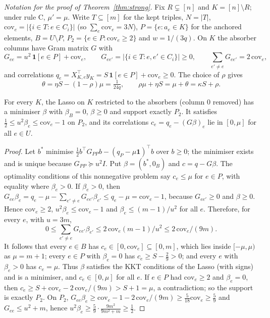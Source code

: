 \noindent\emph{Notation for the proof of Theorem~\ref{thm:strong}.} Fix $R\subsetneq[n]$ and $K=[n]\setminus R$; under rule C, $\mu'=\mu$. Write $T\subseteq[m]$ for the kept triples, $N=|T|$, $\mathrm{cov}_e=\lvert\{i\in T:e\in C_i\}\rvert$ (so $\sum_e\mathrm{cov}_e=3N$), $P=\{e:a_e\in K\}$ for the anchored elements, $B=U\setminus P$, $P_2=\{e\in P:\mathrm{cov}_e\ge2\}$ and $w=1/(3q)$. On $K$ the absorber columns have Gram matrix $G$ with
\[
G_{ee}=u^2\,\mathbf 1[e\in P]+\mathrm{cov}_e,\qquad G_{ee'}=\lvert\{i\in T:e,e'\in C_i\}\rvert\ge0,\qquad \textstyle\sum_{e'\ne e}G_{ee'}=2\,\mathrm{cov}_e,
\]
and correlations $q_e=X_{K,e}^{\top}y_K=S\,\mathbf 1[e\in P]+\mathrm{cov}_e\ge0$. The choice of $\rho$ gives
\begin{equation}\label{eq:theta}
\theta=\eta S-(1-\rho)\mu=\tfrac1{24q},\qquad \rho\mu+\eta S=\mu+\theta=\kappa S+\rho .
\end{equation}

\begin{lemma}\label{lem:absorb}
For every $K$, the Lasso on $K$ restricted to the absorbers (column $0$ removed) has a minimiser $\beta$ with $\beta_B=0$, $\beta\ge0$ and support exactly $P_2$. It satisfies $\tfrac12\le u^2\beta_e\le\mathrm{cov}_e-1$ on $P_2$, and its correlations $c_e=q_e-(G\beta)_e$ lie in $[0,\mu]$ for all $e\in U$.
\end{lemma}
\begin{proof}
Let $b^\ast$ minimise $\frac12b^{\top}G_{PP}b-(q_P-\mu\mathbf 1)^{\top}b$ over $b\ge0$; the minimiser exists and is unique because $G_{PP}\succeq u^2I$. Put $\beta=(b^\ast,0_B)$ and $c=q-G\beta$. The optimality conditions of this nonnegative problem say $c_e\le\mu$ for $e\in P$, with equality where $\beta_e>0$. If $\beta_e>0$, then $G_{ee}\beta_e=q_e-\mu-\sum_{e'\ne e}G_{ee'}\beta_{e'}\le q_e-\mu=\mathrm{cov}_e-1$, because $G_{ee'}\ge0$ and $\beta\ge0$. Hence $\mathrm{cov}_e\ge2$, $u^2\beta_e\le\mathrm{cov}_e-1$ and $\beta_e\le(m-1)/u^2$ for all $e$. Therefore, for every $e$, with $u=3m$,
\[
0\le\textstyle\sum_{e'\ne e}G_{ee'}\beta_{e'}\le 2\,\mathrm{cov}_e(m-1)/u^2\le 2\,\mathrm{cov}_e/(9m).
\]
It follows that every $e\in B$ has $c_e\in[0,\mathrm{cov}_e]\subseteq[0,m]$, which lies inside $[-\mu,\mu)$ as $\mu=m+1$; every $e\in P$ with $\beta_e=0$ has $c_e\ge S-\tfrac29>0$; and every $e$ with $\beta_e>0$ has $c_e=\mu$. Thus $\beta$ satisfies the KKT conditions of the Lasso (with signs) and is a minimiser, and $c_e\in[0,\mu]$ for all $e$. If $e\in P$ had $\mathrm{cov}_e\ge2$ and $\beta_e=0$, then $c_e\ge S+\mathrm{cov}_e-2\,\mathrm{cov}_e/(9m)>S+1=\mu$, a contradiction; so the support is exactly $P_2$. On $P_2$, $G_{ee}\beta_e\ge\mathrm{cov}_e-1-2\,\mathrm{cov}_e/(9m)\ge\frac5{18}\mathrm{cov}_e\ge\frac59$ and $G_{ee}\le u^2+m$, hence $u^2\beta_e\ge\frac59\cdot\frac{9m^2}{9m^2+m}\ge\frac12$.
\end{proof}


